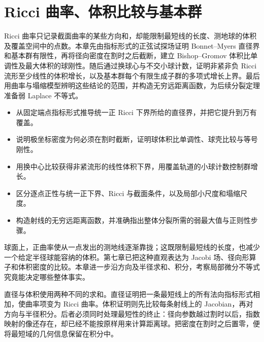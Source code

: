 
% 
% 

\chapter{Ricci 曲率、体积比较与基本群}
\label{g3:ch:08}

\begin{chapterabstract}
	Ricci 曲率只记录截面曲率的某些方向和，却能限制最短线的长度、测地球的体积及覆盖空间中的点数。本章先由指标形式的正弦试探场证明 Bonnet--Myers 直径界和基本群有限性，再将径向密度在割时之后截断，建立 Bishop--Gromov 体积比单调性及最大体积的球刚性。随后通过换球心与不交小球计数，证明非紧非负 Ricci 流形至少线性的体积增长，以及基本群每个有限生成子群的多项式增长上界。最后用曲率与塌缩模型辨明这些结论的范围，并构造无穷远距离函数，为后续分裂定理准备弱 Laplace 不等式。
\end{chapterabstract}

\begin{learninggoals}
	\begin{itemize}
		\item 从固定端点指标形式推导统一正 Ricci 下界所给的直径界，并把它提升到万有覆盖。
		\item 说明极坐标密度为何必须在割时截断，证明球体积比单调性、球壳比较与等号刚性。
		\item 用换中心比较获得非紧流形的线性体积下界，用覆盖轨道的小球计数控制群增长。
		\item 区分逐点正性与统一正下界、Ricci 与截面条件，以及局部小尺度和塌缩尺度。
		\item 构造射线的无穷远距离函数，并准确指出整体分裂所需的弱最大值与正则性步骤。
	\end{itemize}
\end{learninggoals}

球面上，正曲率使从一点发出的测地线逐渐靠拢；这既限制最短线的长度，也减少一个给定半径球能容纳的体积。第七章已把这种直观表达为 Jacobi 场、径向形算子和体积密度的比较。本章进一步沿方向及半径求和、积分，考察局部微分不等式究竟能决定哪些整体事实。

\ProseParagraphBreak

直径与体积使用两种不同的求和。直径证明把一条最短线上的所有法向指标形式相加，使曲率项变为 Ricci 曲率。体积证明则先比较每条射线上的 Jacobian，再对方向与半径积分。后者必须同时处理最短性的终止：径向参数越过割时以后，指数映射的像还存在，却已经不能按原样用来计算距离球。把密度在割时之后置零，便将最短域的几何信息保留在积分中。

